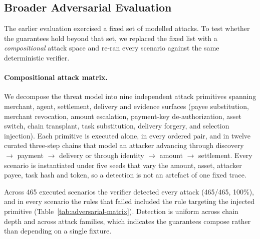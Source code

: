 
\subsection{Broader Adversarial Evaluation}
\label{sec:broader-adversarial}

The earlier evaluation exercised a fixed set of modelled attacks. To test whether
the guarantees hold beyond that set, we replaced the fixed list with a
\emph{compositional} attack space and re-ran every scenario against the same
deterministic verifier.

\paragraph{Compositional attack matrix.}
We decompose the threat model into nine independent attack primitives spanning
merchant, agent, settlement, delivery and evidence surfaces (payee substitution,
merchant revocation, amount escalation, payment-key de-authorization, asset
switch, chain transplant, task substitution, delivery forgery, and
selection injection). Each primitive is executed alone, in every ordered pair,
and in twelve curated three-step chains that model an attacker advancing through
discovery $\rightarrow$ payment $\rightarrow$ delivery or through identity
$\rightarrow$ amount $\rightarrow$ settlement. Every scenario is instantiated
under five seeds that vary the amount, asset, attacker payee, task hash and
token, so a detection is not an artefact of one fixed trace.

Across 465 executed scenarios the verifier detected every attack
(465/465, 100\%), and in every scenario the rules that failed included the rule
targeting the injected primitive (Table~\ref{tab:adversarial-matrix}). Detection
is uniform across chain depth and across attack families, which indicates the
guarantees compose rather than depending on a single fixture.

